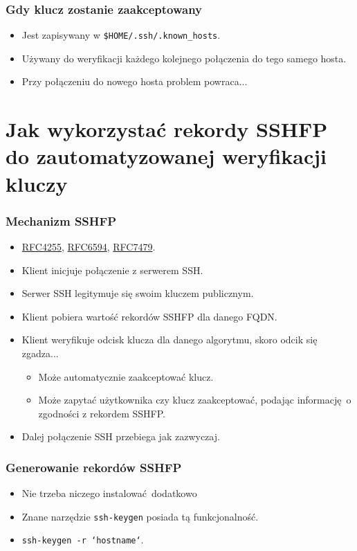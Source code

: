 \documentclass[dvipsnames,table]{beamer}
\begin{document}
\begin{frame}
\frametitle{Gdy klucz zostanie zaakceptowany}
\begin{itemize}
	\item Jest zapisywany w {\tt \$HOME/.ssh/.known\_hosts}.
	\item Używany do weryfikacji każdego kolejnego połączenia do tego samego hosta.
	\item Przy połączeniu do nowego hosta problem powraca...
\end{itemize}
\end{frame}

\section{Jak wykorzystać rekordy SSHFP do zautomatyzowanej weryfikacji kluczy}

\begin{frame}
\frametitle{Mechanizm SSHFP}
\begin{itemize}
	\item \href{https://tools.ietf.org/html/rfc4255}{RFC4255},
		  \href{https://tools.ietf.org/html/rfc6594}{RFC6594},
		  \href{https://tools.ietf.org/html/rfc7479}{RFC7479}.
	\item Klient inicjuje połączenie z serwerem SSH.
	\item Serwer SSH legitymuje się swoim kluczem publicznym.
	\item Klient pobiera wartość rekordów SSHFP dla danego FQDN.
	\item Klient weryfikuje odcisk klucza dla danego algorytmu, skoro odcik się zgadza...
	\begin{itemize}
		\item Może automatycznie zaakceptować klucz.
		\item Może zapytać użytkownika czy klucz zaakceptować, podając informację o zgodności z rekordem SSHFP.
	\end{itemize}
	\item Dalej połączenie SSH przebiega jak zazwyczaj.
\end{itemize}
\end{frame}

\begin{frame}
\frametitle{Generowanie rekordów SSHFP}
\begin{itemize}
	\item Nie trzeba niczego instalować dodatkowo \Smiley
	\item Znane narzędzie {\tt ssh-keygen} posiada tą funkcjonalność.
	\item {\tt ssh-keygen -r `hostname`}.
\end{itemize}
\end{frame}
\end{document}
